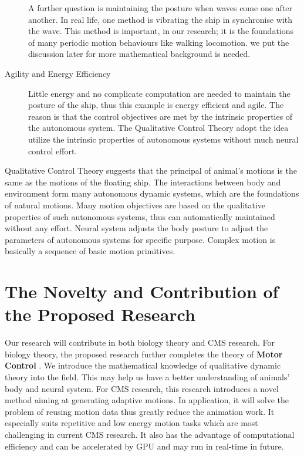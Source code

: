\begin{description}
A further question is maintaining the posture when waves come one after another.
In real life, one method is vibrating the ship in synchronise with the wave.
This method is important, in our research; it is the foundations of many periodic motion behaviours like walking locomotion.
we put the discussion later for more mathematical background is needed.
\item[Agility and Energy Efficiency]
Little energy and no complicate computation are needed to maintain the posture of the ship,
thus this example is energy efficient and agile.
The reason is that the control objectives are met by the intrinsic properties of the autonomous system.
The Qualitative Control Theory adopt the idea utilize the intrinsic properties of autonomous systems without much neural control effort.
\end{description}

Qualitative Control Theory suggests that the principal of animal's motions is the same as the motions of the floating ship.
The interactions between body and environment form many autonomous dynamic systems, which are the foundations of natural motions.
Many motion objectives are based on the qualitative properties of such autonomous systems, thus can automatically maintained without any effort.
Neural system adjusts the body posture to adjust the parameters of autonomous systems for specific purpose.
Complex motion is basically a sequence of basic motion primitives.


\section{The Novelty and Contribution of the Proposed Research} 
Our research will contribute in both biology theory and CMS research.
For biology theory, the proposed research further completes the theory of \textbf{Motor Control} . 
We introduce the mathematical knowledge of qualitative dynamic theory into the field.
This may help us have a better understanding of animals' body and neural system.
For CMS research, this research introduces a novel method aiming at generating adaptive motions. 
In application, it will solve the problem of reusing motion data thus greatly reduce the animation work.
It especially suits repetitive and low energy motion tasks which are most challenging in current CMS research.
It also has the advantage of computational efficiency and can be accelerated by GPU and may run in real-time in future.

